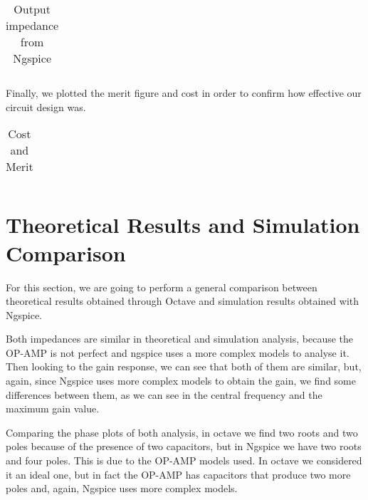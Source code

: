 \begin{table}[H]
\centering
\begin{tabularx}{0.6\textwidth} {
  | >{\raggedright\arraybackslash}X
  | >{\raggedleft\arraybackslash}X | }
 \hline

\end{tabularx}
\caption{Output impedance from Ngspice}
\end{table}



Finally, we plotted the merit figure and cost in order to confirm how effective our circuit design was.


\begin{table}[H]
\centering
\begin{tabularx}{0.6\textwidth} {
  | >{\raggedright\arraybackslash}X
  | >{\raggedleft\arraybackslash}X | }
 \hline

\end{tabularx}
\caption{Cost and Merit}
\end{table}
\section{Theoretical Results and Simulation Comparison}

For this section, we are going to perform a general comparison between theoretical results obtained through Octave and simulation results obtained with Ngspice.

Both impedances are similar in theoretical and simulation
analysis, because the OP-AMP is not perfect and ngspice uses a more complex models to analyse it.
Then looking to the gain response, we can see that both of them are similar, but, again, since Ngspice uses more complex models to obtain the gain, we find some differences between them, as we can see in the central frequency and the maximum gain value.

Comparing the phase plots of both analysis, in octave we find two roots and two poles because of the presence of two capacitors, but in Ngspice we have two roots and four poles. This is due to the OP-AMP models used. In octave we considered it an ideal one, but in fact the OP-AMP has capacitors that produce two more poles and, again, Ngspice uses more complex models.

